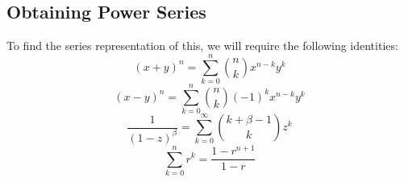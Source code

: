 	\subsection{Obtaining Power Series}
	To find the series representation of this, we will require the following identities:
	\begin{equation}\label{eq:binomial}
		(x + y)^n = \sum_{k=0}^n {n \choose k} x^{n-k}y^k
	\end{equation}
	\begin{equation}\label{eq:sub_binomial}
		(x - y)^n = \sum_{k=0}^n {n \choose k} (-1)^k x^{n-k}y^k
	\end{equation}
	\begin{equation}\label{eq:binomial_special}
		\frac{1}{(1-z)^\beta} = \sum_{k=0}^\infty {k + \beta -1 \choose k} z^k
	\end{equation}
	\begin{equation}\label{eq:geometric}
		\sum_{k=0}^n r^k = \frac{1 - r^{n+1}}{1 - r}
	\end{equation}

